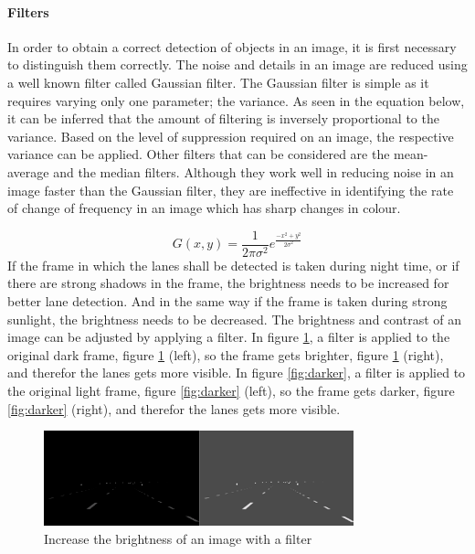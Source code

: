 \paragraph{Filters}
In order to obtain a correct detection of objects in an image, it is first necessary to distinguish them correctly. The noise and details in an image are reduced using a well known filter called Gaussian filter. The Gaussian filter is simple as it requires varying only one parameter; the variance. As seen in the equation below, it can be inferred that the amount of filtering is inversely proportional to the variance. Based on the level of suppression required on an image, the respective variance can be applied.
Other filters that can be considered are the mean-average and the median filters. Although they work well in reducing noise in an image faster than the Gaussian filter, they are ineffective in identifying the rate of change of frequency in an image which has sharp changes in colour.

\begin{equation} 
G(x,y)= \frac{1}{2\pi \sigma^2} e^ \frac{-x^2+y^2}{2\sigma^2}
\end{equation}
If the frame in which the lanes shall be detected is taken during night time, or if there are strong shadows in the frame, the brightness needs to be increased for better lane detection. And in the same way if the frame is taken during strong sunlight, the brightness needs to be decreased. The brightness and contrast of an image can be adjusted by applying a filter. In figure \ref{fig:lighter}, a filter is applied to the original dark frame, figure \ref{fig:lighter} (left), so the frame gets brighter, figure \ref{fig:lighter} (right), and therefor the lanes gets more visible. In figure \ref{fig:darker}, a filter is applied to the original light frame, figure \ref{fig:darker} (left), so the frame gets darker, figure \ref{fig:darker} (right), and therefor the lanes gets more visible.

\begin{figure}[H]
    \centering
    \includegraphics[width = 0.8\textwidth]{Figures/lighter.png}
    \caption{Increase the brightness of an image with a filter}
    \label{fig:lighter}
\end{figure}


